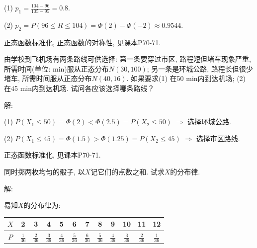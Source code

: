 \documentclass[standard]{ExBook}
\begin{document}
\begin{qitems}
\begin{bbox}
(1) $p_{1}=\frac{104-96}{105-95}=0.8$.

(2) $p_{2}=P(96\leq R\leq 104)=\Phi(2)-\Phi(-2)\approx0.9544$.

\textcolor{themeColor}{\selectfont {} 正态函数标准化, 正态函数的对称性, 见课本P70-71.}
    \end{bbox}

\vspace{-5em}

    \begin{bbox}
    \begin{shaded}
        \qitem
由学校到飞机场有两条路线可供选择: 第一条要穿过市区, 路程短但堵车现象严重, 所需时间(单位: min)服从正态分布$N(30,100)$; 另一条是环城公路, 路程长但很少堵车, 所需时间服从正态分布$N(40,16)$. 如果要求(1) 在50 min内到达机场; (2) 在45 min内到达机场. 试问各应该选择哪条路线？
    \end{shaded}
    \end{bbox}

\vspace{-5em}

    \begin{bbox}
解: 

(1) $P(X_{1}\leq50)=\Phi(2)<\Phi(2.5)=P(X_{2}\leq50)$ $\Longrightarrow$ 选择环城公路.

(2) $P(X_{1}\leq45)=\Phi(1.5)>\Phi(1.25)=P(X_{2}\leq45)$ $\Longrightarrow$ 选择市区路线.

\textcolor{themeColor}{\selectfont {} 正态函数标准化, 见课本P70-71.}
    \end{bbox}

\vspace{-5em}

    \begin{bbox}
    \begin{shaded}
        \qitem
同时掷两枚均匀的骰子, 以$X$记它们的点数之和. 试求$X$的分布律.
    \end{shaded}
    \end{bbox}

\vspace{-5em}

    \begin{bbox}
解: 

易知$X$的分布律为:
\begin{center}
\begin{tabular}{c|ccccccccccc}
    \hline
    $X$ & 2 & 3 & 4 & 5 & 6 & 7 & 8 & 9 & 10 & 11 & 12\\
    \hline
    $P$ & $\frac{1}{36}$ & $\frac{2}{36}$ & $\frac{3}{36}$ & $\frac{4}{36}$ & $\frac{5}{36}$ & $\frac{6}{36}$ & $\frac{5}{36}$ & $\frac{4}{36}$ & $\frac{3}{36}$ & $\frac{2}{36}$ & $\frac{1}{36}$ \\
    \hline
\end{tabular}
\end{center}
    \end{bbox}


\end{qitems}
\end{document}
